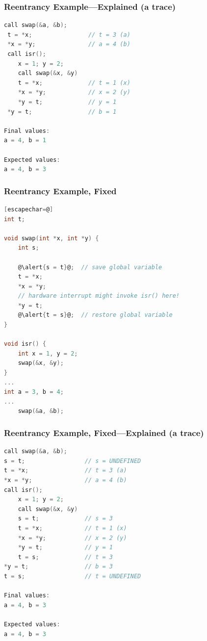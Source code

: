 \begin{frame}[fragile]
  \frametitle{Reentrancy Example---Explained (a trace)}

  
  \begin{lstlisting}[language=C]
call swap(&a, &b);
 t = *x;                // t = 3 (a)
 *x = *y;               // a = 4 (b)
 call isr();
    x = 1; y = 2;
    call swap(&x, &y)
    t = *x;             // t = 1 (x)
    *x = *y;            // x = 2 (y)
    *y = t;             // y = 1
 *y = t;                // b = 1

Final values:
a = 4, b = 1

Expected values:
a = 4, b = 3
  \end{lstlisting}
  
\end{frame}

\begin{frame}[fragile]
  \frametitle{Reentrancy Example, Fixed}

  
  \begin{lstlisting}[language=C][escapechar=@]
int t;
 
void swap(int *x, int *y) {
    int s;
 
    @\alert{s = t}@;  // save global variable
    t = *x;
    *x = *y;
    // hardware interrupt might invoke isr() here!
    *y = t;
    @\alert{t = s}@;  // restore global variable
}
 
void isr() {
    int x = 1, y = 2;
    swap(&x, &y);
}
...
int a = 3, b = 4;
...
    swap(&a, &b);
  \end{lstlisting}
  
\end{frame}

\begin{frame}[fragile]
  \frametitle{Reentrancy Example, Fixed---Explained (a trace)}

  
  \begin{lstlisting}[language=C]
call swap(&a, &b);
s = t;                 // s = UNDEFINED
t = *x;                // t = 3 (a)
*x = *y;               // a = 4 (b)
call isr();
    x = 1; y = 2;
    call swap(&x, &y)
    s = t;             // s = 3
    t = *x;            // t = 1 (x)
    *x = *y;           // x = 2 (y)
    *y = t;            // y = 1
    t = s;             // t = 3
*y = t;                // b = 3
t = s;                 // t = UNDEFINED

Final values:
a = 4, b = 3

Expected values:
a = 4, b = 3
  \end{lstlisting}
  
\end{frame}

